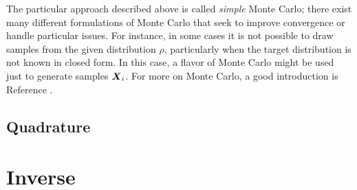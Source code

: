 \documentclass[../primer.tex]{subfiles}
\begin{document}
The particular approach described above is called \emph{simple} Monte Carlo;
there exist many different formulations of Monte Carlo that seek to improve
convergence or handle particular issues. For instance, in some cases it is not
possible to draw samples from the given distribution $\rho$, particularly when
the target distribution is not known in closed form. In this case, a flavor of
Monte Carlo might be used just to generate samples $\boldsymbol{X}_i$. For more on Monte
Carlo, a good introduction is Reference \cite{owen2013montecarlo}.

\subsection{Quadrature}

\section{Inverse}
\end{document}
